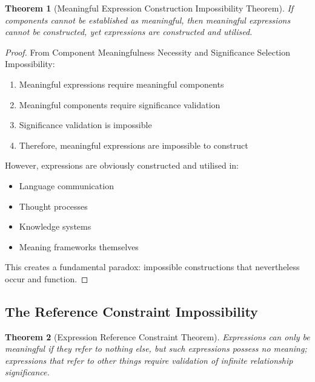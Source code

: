 \documentclass[12pt,a4paper]{article}
\newtheorem{theorem}{Theorem}[section]
\begin{document}
\begin{theorem}[Meaningful Expression Construction Impossibility Theorem]
If components cannot be established as meaningful, then meaningful expressions cannot be constructed, yet expressions are constructed and utilised.
\end{theorem}

\begin{proof}
From Component Meaningfulness Necessity and Significance Selection Impossibility:
\begin{enumerate}
\item Meaningful expressions require meaningful components
\item Meaningful components require significance validation
\item Significance validation is impossible
\item Therefore, meaningful expressions are impossible to construct
\end{enumerate}

However, expressions are obviously constructed and utilised in:
\begin{itemize}
\item Language communication
\item Thought processes
\item Knowledge systems
\item Meaning frameworks themselves
\end{itemize}

This creates a fundamental paradox: impossible constructions that nevertheless occur and function.
\end{proof}

\subsection{The Reference Constraint Impossibility}

\begin{theorem}[Expression Reference Constraint Theorem]
Expressions can only be meaningful if they refer to nothing else, but such expressions possess no meaning; expressions that refer to other things require validation of infinite relationship significance.
\end{theorem}
\end{document}
